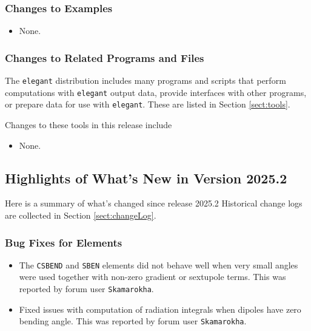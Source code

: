 \documentclass[11pt]{article}
\begin{document}
\subsubsection{Changes to Examples}

\begin{itemize}
\item None.
\end{itemize}

\subsubsection{Changes to Related Programs and Files}

The {\tt elegant} distribution includes many programs and scripts that perform computations with {\tt elegant}
output data, provide interfaces with other programs, or prepare data for use with {\tt elegant}. These
are listed in Section \ref{sect:tools}. 

Changes to these tools in this release include
\begin{itemize}
\item None.
\end{itemize}

\subsection{Highlights of What's New in Version 2025.2}

Here is a summary of what's changed since release 2025.2  Historical change logs are collected in Section
\ref{sect:changeLog}.

\subsubsection{Bug Fixes for Elements}

\begin{itemize}
\item The \verb|CSBEND| and \verb|SBEN| elements did not behave well when very small angles were used together with
  non-zero gradient or sextupole terms. This was reported by forum user \verb|Skamarokha|.
\item Fixed issues with computation of radiation integrals when dipoles have zero bending angle. This was reported by forum user \verb|Skamarokha|.
\end{itemize}
\end{document}
